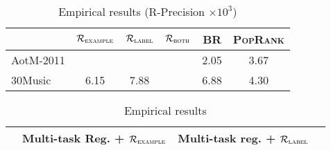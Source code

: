 \begin{table}[!h]
\centering
\caption{Empirical results (R-Precision $\times 10^3$)}
\small
\begin{tabular}{l|ccccc}
\toprule
{}            & $\mathcal{R}_\textsc{example}$ & $\mathcal{R}_\textsc{label}$ & $\mathcal{R}_\textsc{both}$ & BR & \textsc{PopRank} \\
\midrule
AotM-2011     &  &  &  & 2.05 & 3.67 \\
30Music       & 6.15 & 7.88 &  & 6.88 & 4.30 \\
\bottomrule
\end{tabular}
\end{table}

\begin{table}[!h]
\centering
\caption{Empirical results}
\begin{tabular}{l|ccc}
\toprule
{}            & Multi-task Reg. + $\mathcal{R}_\textsc{example}$ & Multi-task reg. + $\mathcal{R}_\textsc{label}$ \\
\midrule
\bottomrule
\end{tabular}
\end{table}
